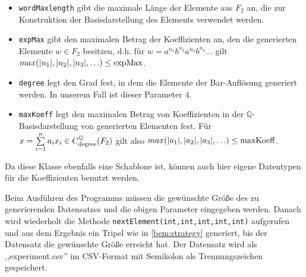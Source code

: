 \documentclass[a4paper,twoside,10pt]{scrreprt}
\newcommand{\Q}{\mathbb{Q}}
\theoremstyle{definition}
\begin{document}
\begin{itemize}
\begin{itemize}
\item \lstinline|wordMaxlength| gibt die maximale Länge der Elemente aus $F_2$ an, die zur Konstruktion der Basisdarstellung des Elements verwendet werden.
\item \lstinline|expMax| gibt den maximalen Betrag der Koeffizienten an, den die generierten Elemente $w\in F_2$ besitzen, d.h. für $w=a^{n_1}b^{n_2}a^{n_3}b^{n_4}\ldots$ gilt $max(|n_1|,|n_2|,\\|n_3|,\ldots)\leq \text{\lstinline|expMax|}$.
\item \lstinline|degree| legt den Grad fest, in dem die Elemente der Bar-Auflösung generiert werden. In unserem Fall ist dieser Parameter $4$.
\item \lstinline|maxKoeff| legt den maximalen Betrag von Koeffizienten in der $\Q$-Basis\-darstellung von generierten Elementen fest. Für $x=\sum\limits_{i=1}^na_ix_i\in C_{\text{\lstinline|degree|}}^{\Q}(F_2)$ gilt also $max(|a_1|,|a_2|,|a_3|,\ldots)\leq \text{\lstinline|maxKoeff|}$.
\end{itemize}
Da diese Klasse ebenfalls eine Schablone ist, können auch hier eigene Datentypen für die Koeffizienten benutzt werden.
\end{itemize}
Beim Ausführen des Programms müssen die gewünschte Größe des zu generierenden Datensatzes und die obigen Parameter eingegeben werden. Danach wird wiederholt die Methode \lstinline|nextElement(int,int,int,int,int)| aufgerufen und aus dem Ergebnis ein Tripel wie in \cref{bem:strategy} generiert, bis der Datensatz die gewünschte Größe erreicht hat. Der Datensatz wird als ,,experiment.csv'' im CSV-Format mit Semikolon als Trennungszeichen gespeichert.
\end{document}
